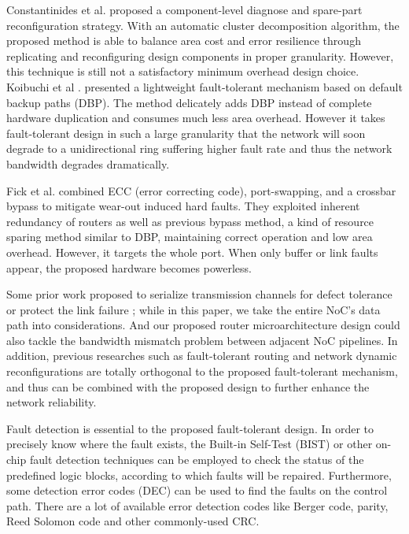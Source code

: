 Constantinides et al. \cite{dumitras2003chip} proposed a component-level diagnose and spare-part reconfiguration strategy. With an automatic cluster decomposition algorithm, the proposed method is able to balance area cost and error resilience through replicating and reconfiguring design components in proper granularity. However, this technique is still not a satisfactory minimum overhead design choice. Koibuchi et al \cite{puente2001adaptive}. presented a lightweight fault-tolerant mechanism based on default backup paths (DBP). The method delicately adds DBP instead of complete hardware duplication and consumes much less area overhead. However it takes fault-tolerant design in such a large granularity that the network will soon degrade to a unidirectional ring suffering higher fault rate and thus the network bandwidth degrades dramatically.

Fick et al. \cite{xiang2011efficient} combined ECC (error correcting code), port-swapping, and a crossbar bypass to mitigate wear-out induced hard faults. They exploited inherent redundancy of routers as well as previous bypass method, a kind of resource sparing method similar to DBP, maintaining correct operation and low area overhead. However, it targets the whole port. When only buffer or link faults appear, the proposed hardware becomes powerless.

Some prior work proposed to serialize transmission channels for defect tolerance \cite{fick2009highly} or protect the link failure \cite{ho2004new} \cite{gomez2006routing}; while in this paper, we take the entire NoC's data path into considerations. And our proposed router microarchitecture design could also tackle the bandwidth mismatch problem between adjacent NoC pipelines. In addition, previous researches such as fault-tolerant routing and network dynamic reconfigurations \cite{dally2004principles} \cite{xiang2011efficient} \cite{fu2011new} \cite{mejia2006segment} are totally orthogonal to the proposed fault-tolerant mechanism, and thus can be combined with the proposed design to further enhance the network reliability.

Fault detection is essential to the proposed fault-tolerant design. In order to precisely know where the fault exists, the Built-in Self-Test (BIST) \cite{wu2003fault} or other on-chip fault detection techniques \cite{flich2008efficient} \cite{rodrigo2010addressing} \cite{feng2012addressing} \cite{li2001loop} can be employed to check the status of the predefined logic blocks, according to which faults will be repaired. Furthermore, some detection error codes (DEC) can be used to find the faults on the control path. There are a lot of available error detection codes like Berger code, parity, Reed Solomon code and other commonly-used CRC.


